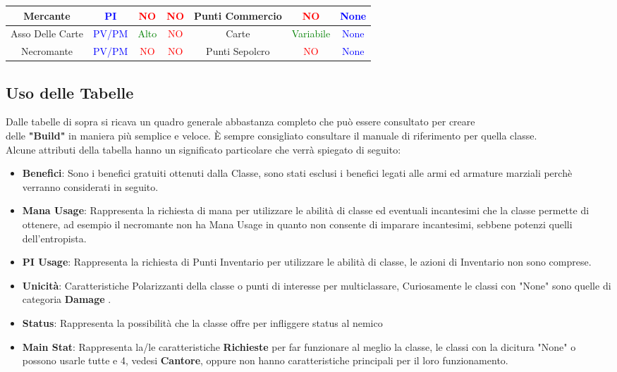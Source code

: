 \documentclass{article}
\begin{document}
\begin{table}[h]
\begin{tabular}{|c|c|c|c|c|c|c|}
      \hline
      \centering Mercante& \textcolor{blue}{PI}   & \textcolor{red}{NO} & \textcolor{red}{NO} & Punti Commercio & \textcolor{red}{NO} &\textcolor{blue}{None} \\
      \hline
      \centering Asso Delle Carte& \textcolor{blue}{PV/PM}   & \textcolor{green}{Alto} & \textcolor{red}{NO} & Carte & \textcolor{green}{Variabile} &\textcolor{blue}{None} \\
      \hline
      \centering Necromante& \textcolor{blue}{PV/PM}   & \textcolor{red}{NO} & \textcolor{red}{NO} & Punti Sepolcro & \textcolor{red}{NO} &\textcolor{blue}{None} \\
      \hline
    \end{tabular}
  \end{table}
\newpage
\subsection{Uso delle Tabelle}
Dalle tabelle di sopra si ricava un quadro generale abbastanza completo che può essere consultato per creare \\
delle \textbf{"Build"} in maniera più semplice e veloce. È sempre consigliato consultare il manuale di riferimento per quella classe.\\
Alcune attributi della tabella hanno un significato particolare che verrà spiegato di seguito:
\begin{itemize}
  \item \textbf{Benefici}: Sono i benefici gratuiti ottenuti dalla Classe, sono stati esclusi i benefici legati alle armi ed armature marziali perchè verranno considerati in seguito.
  \item \textbf{Mana Usage}: Rappresenta la richiesta di mana per utilizzare le abilità di classe ed eventuali incantesimi che la classe permette di ottenere, ad esempio il necromante non ha Mana Usage in quanto non consente di imparare incantesimi, sebbene potenzi quelli dell'entropista.
  \item \textbf{PI Usage}: Rappresenta la richiesta di Punti Inventario per utilizzare le abilità di classe, le azioni di Inventario non sono comprese.
  \item \textbf{Unicità}: Caratteristiche Polarizzanti della classe o punti di interesse per multiclassare, Curiosamente le classi con "None" sono quelle di categoria \textbf{Damage} .
  \item \textbf{Status}: Rappresenta la possibilità che la classe offre per infliggere status al nemico
  \item \textbf{Main Stat}: Rappresenta la/le caratteristiche \textbf{Richieste} per far funzionare al meglio la classe, le classi con la dicitura "None" o possono usarle tutte e 4, vedesi \textbf{Cantore}, oppure non hanno caratteristiche principali per il loro funzionamento.
\end{itemize}
\end{document}
